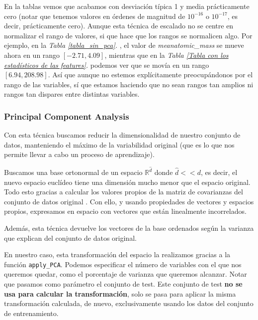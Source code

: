 \documentclass[11pt]{article}
\begin{document}
En la tablas vemos que acabamos con desviación típica 1 y media prácticamente cero (notar que tenemos valores en órdenes de magnitud de $10^{-16}$ o $10^{-17}$, es decir, prácticamente cero). Aunque esta técnica de escalado no se centre en normalizar el rango de valores, si que hace que los rangos se normalicen algo. Por ejemplo, en la \emph{Tabla \ref{tabla_sin_pca}. }, el valor de \emph{meanatomic\_mass} se mueve ahora en un rango $[-2.71, 4.09]$, mientras que en la \emph{Tabla \ref{Tabla con los estadísticos de las features}. } podemos ver que se movía en un rango $[6.94, 208.98]$. Así que aunque no estemos explícitamente preocupándonos por el rango de las variables, sí que estamos haciendo que no sean rangos tan amplios ni rangos tan dispares entre distintas variables.

\subsubsection{Principal Component Analysis}

Con esta técnica buscamos reducir la dimensionalidad de nuestro conjunto de datos, manteniendo el máximo de la variabilidad original (que es lo que nos permite llevar a cabo un proceso de aprendizaje).

Buscamos una base ortonormal de un espacio $\mathbb{R}^{\hat{d}}$ donde $\hat{d} << d$, es decir, el nuevo espacio euclídeo tiene una dimensión mucho menor que el espacio original. Todo esto gracias a calcular los valores propios de la matriz de covarianzas del conjunto de datos original \cite{pca_wikipedia:online} \cite{pca_article:online}. Con ello, y usando propiedades de vectores y espacios propios, expresamos en espacio con vectores que están linealmente incorrelados.

Además, esta técnica devuelve los vectores de la base ordenados según la varianza que explican del conjunto de datos original.

En nuestro caso, esta transformación del espacio la realizamos gracias a la función \lstinline{apply_PCA}. Podemos especificar el número de variables con el que nos queremos quedar, como el porcentaje de varianza que queremos alcanzar. Notar que pasamos como parámetro el conjunto de test. Este conjunto de test \textbf{no se usa para calcular la transformación}, solo se pasa para aplicar la misma transformación calculada, de nuevo, exclusivamente usando los datos del conjunto de entrenamiento.
\end{document}
